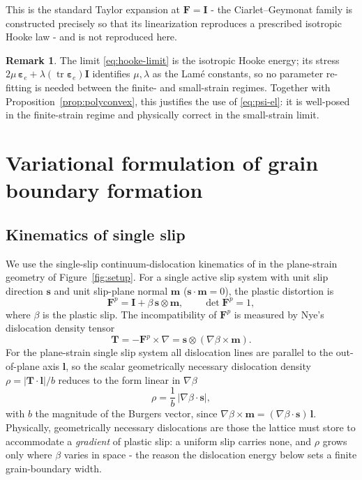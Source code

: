 \documentclass[12pt]{article}
\theoremstyle{plain}
\theoremstyle{definition}
\newtheorem{remark}[theorem]{Remark}
\newcommand{\bF}{\bm{F}}
\newcommand{\bs}{\bm{s}}
\newcommand{\bmm}{\bm{m}}
\newcommand{\bI}{\bm{I}}
\newcommand{\Fp}{\bF^{p}}
\newcommand{\tr}{\operatorname{tr}}
\begin{document}
\noindent This is the standard Taylor expansion at $\bF=\bI$ - the
Ciarlet--Geymonat family is constructed precisely so that its linearization
reproduces a prescribed isotropic Hooke law
\citep{ciarlet1982lois,ciarlet1988mathematical} - and is not reproduced here.

\begin{remark}\label{rem:hooke}
The limit \eqref{eq:hooke-limit} is the isotropic Hooke energy; its stress
$2\mu\,\bm{\varepsilon}_e+\lambda(\tr\bm{\varepsilon}_e)\bI$ identifies
$\mu,\lambda$ as the Lam\'e constants, so no parameter re-fitting is needed
between the finite- and small-strain regimes. Together with
Proposition~\ref{prop:polyconvex}, this justifies the use of \eqref{eq:psi-el}:
it is well-posed in the finite-strain regime and physically correct in the
small-strain limit.
\end{remark}

\section{Variational formulation of grain boundary formation}\label{sec:var}

\subsection{Kinematics of single slip}\label{sec:kinematics}
We use the single-slip continuum-dislocation kinematics of
\citet{koster2015aformation} in the plane-strain geometry of
Figure~\ref{fig:setup}. For a single active slip system with unit slip direction
$\bs$ and unit slip-plane normal $\bmm$ ($\bs\cdot\bmm=0$), the plastic
distortion is
\begin{equation}\label{eq:Fp-slip}
  \Fp=\bI+\beta\,\bs\otimes\bmm ,
  \qquad \det\Fp=1 ,
\end{equation}
where $\beta$ is the plastic slip.
The incompatibility of $\Fp$ is measured by Nye's dislocation density tensor
\citep{nye1953some,bilby1955types,kroner1955fundamentale}
\begin{equation}\label{eq:nye}
  \bm{T}=-\Fp\times\nabla=\bs\otimes(\nabla\beta\times\bmm).
\end{equation}
For the plane-strain single slip system
all dislocation lines are parallel to the out-of-plane axis $\bm{l}$, so the
scalar geometrically necessary dislocation density $\rho=|\bm{T}\cdot\bm{l}|/b$
reduces to the form linear in $\nabla\beta$
\begin{equation}\label{eq:rho}
  \rho=\frac1b\,\bigl|\nabla\beta\cdot\bs\bigr| ,
\end{equation}
with $b$ the magnitude of the Burgers vector, since
$\nabla\beta\times\bmm=(\nabla\beta\cdot\bs)\,\bm{l}$. Physically, geometrically necessary dislocations are
those the lattice must store to accommodate a \emph{gradient} of plastic slip:
a uniform slip carries none, and $\rho$ grows only where $\beta$ varies in space -
the reason the dislocation energy below sets a finite grain-boundary width.
\end{document}
